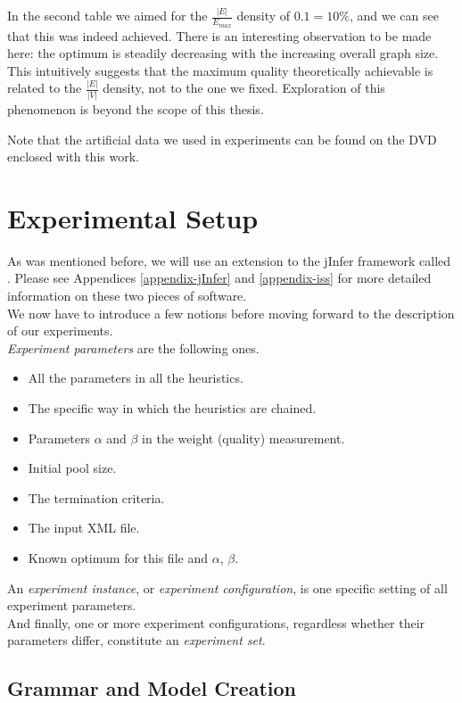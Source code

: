 In the second table we aimed for the $\frac{|E|}{E_{max}}$ density of $0.1 = 10\%$, and we can see that this was indeed achieved. There is an interesting observation to be made here: the optimum is steadily decreasing with the increasing overall graph size. This intuitively suggests that the maximum quality theoretically achievable is related to the $\frac{|E|}{|V|}$ density, not to the one we fixed. Exploration of this phenomenon is beyond the scope of this thesis.

Note that the artificial data we used in experiments can be found on the DVD enclosed with this work.

\section{Experimental Setup}

As was mentioned before, we will use an extension to the jInfer framework called . Please see Appendices \ref{appendix-jInfer} and \ref{appendix-iss} for more detailed information on these two pieces of software.\\

We now have to introduce a few notions before moving forward to the description of our experiments.\\

\textit{Experiment parameters} are the following ones.
\begin{itemize}
	\item All the parameters in all the heuristics.
	\item The specific way in which the heuristics are chained.
	\item Parameters $\alpha$ and $\beta$ in the weight (quality) measurement.
	\item Initial pool size.
	\item The termination criteria.
	\item The input XML file.
	\item Known optimum for this file and $\alpha$, $\beta$.
\end{itemize}

An \textit{experiment instance}, or \textit{experiment configuration}, is one specific setting of all experiment parameters.\\

And finally, one or more experiment configurations, regardless whether their parameters differ, constitute an \textit{experiment set}.

\subsection{Grammar and Model Creation}

